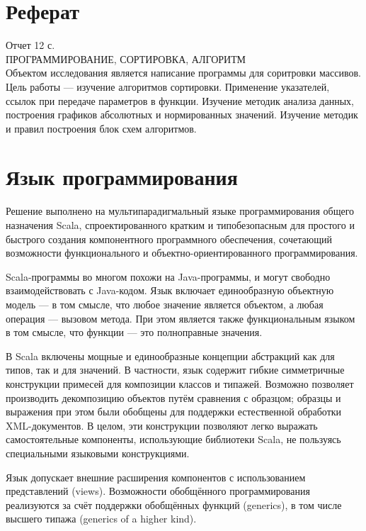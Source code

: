 \documentclass[a4paper,14pt,russian]{report}
\begin{document}


\newpage
{}
\setcounter{page}{2}

\tableofcontents

\section{Реферат}

\noindent
Отчет 12 с. \\
ПРОГРАММИРОВАНИЕ, СОРТИРОВКА, АЛГОРИТМ \\
Объектом исследования является написание программы для соритровки массивов. \\
Цель работы — изучение алгоритмов сортировки. Применение указателей, ссылок при передаче параметров в функции. Изучение методик анализа данных, построения графиков абсолютных и нормированных значений. Изучение методик и правил построения блок схем алгоритмов.

\section{Язык программирования}

Решение выполнено на мультипарадигмальный языке программирования общего назначения Scala, спроектированного кратким и типобезопасным для простого и быстрого создания компонентного программного обеспечения, сочетающий возможности функционального и объектно-ориентированного программирования.

Scala-программы во многом похожи на Java-программы, и могут свободно взаимодействовать с Java-кодом. Язык включает единообразную объектную модель — в том смысле, что любое значение является объектом, а любая операция — вызовом метода. При этом является также функциональным языком в том смысле, что функции — это полноправные значения.

В Scala включены мощные и единообразные концепции абстракций как для типов, так и для значений. В частности, язык содержит гибкие симметричные конструкции примесей для композиции классов и типажей. Возможно позволяет производить декомпозицию объектов путём сравнения с образцом; образцы и выражения при этом были обобщены для поддержки естественной обработки XML-документов. В целом, эти конструкции позволяют легко выражать самостоятельные компоненты, использующие библиотеки Scala, не пользуясь специальными языковыми конструкциями.

Язык допускает внешние расширения компонентов с использованием представлений (views). Возможности обобщённого программирования реализуются за счёт поддержки обобщённых функций (generics), в том числе высшего типажа (generics of a higher kind).
\end{document}
